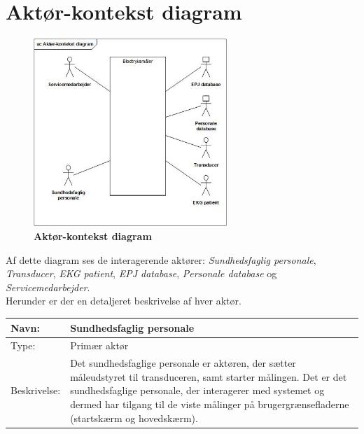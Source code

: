\newpage

\section{Aktør-kontekst diagram}
\begin{figure}[h!]
\includegraphics[width =0.65\textwidth , center]{billeder/Aktorkontekst.jpg}
\caption{\textbf{Aktør-kontekst diagram}}
\end{figure}

Af dette diagram ses de interagerende aktører: \textit{Sundhedsfaglig personale}, \textit{Transducer}, \textit{EKG patient}, \textit{EPJ database}, \textit{Personale database} og \textit{Servicemedarbejder}.\\ Herunder er der en detaljeret beskrivelse af hver aktør.

\begin{table}[h!]
\begin{tabular}{| >{\raggedright\arraybackslash}p{3cm} | >{\raggedright\arraybackslash}p{12cm} |}
   \hline
   Navn: & Sundhedsfaglig personale\\ \hline
   Type: & Primær aktør \\ \hline
   Beskrivelse: & Det sundhedsfaglige personale er aktøren, der sætter måleudstyret til transduceren, samt starter målingen. Det er det sundhedsfaglige personale, der interagerer med systemet og dermed har tilgang til de viste målinger på brugergrænsefladerne (startskærm og hovedskærm).\\ \hline
\end{tabular}
\end{table}


